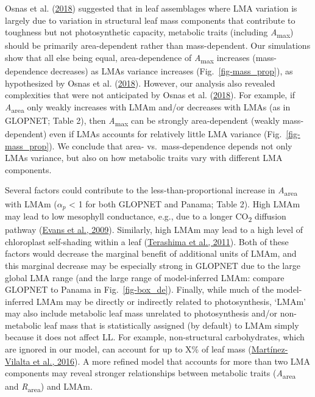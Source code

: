 \documentclass[
  12pt,
  letterpaper,
  DIV=11,
  numbers=noendperiod]{scrartcl}
\begin{document}
Osnas et al. (\protect\hyperlink{ref-Osnas2018}{2018}) suggested that in
leaf assemblages where LMA variation is largely due to variation in
structural leaf mass components that contribute to toughness but not
photosynthetic capacity, metabolic traits (including
\emph{A}\textsubscript{max}) should be primarily area-dependent rather
than mass-dependent. Our simulations show that all else being equal,
area-dependence of \emph{A}\textsubscript{max} increases
(mass-dependence decreases) as LMAs variance increases
(Fig.~\ref{fig-mass_prop}), as hypothesized by Osnas et al.
(\protect\hyperlink{ref-Osnas2018}{2018}). However, our analysis also
revealed complexities that were not anticipated by Osnas et al.
(\protect\hyperlink{ref-Osnas2018}{2018}). For example, if
\emph{A}\textsubscript{area} only weakly increases with LMAm and/or
decreases with LMAs (as in GLOPNET; Table 2), then
\emph{A}\textsubscript{max} can be strongly area-dependent (weakly
mass-dependent) even if LMAs accounts for relatively little LMA variance
(Fig.~\ref{fig-mass_prop}). We conclude that area- vs.~mass-dependence
depends not only LMAs variance, but also on how metabolic traits vary
with different LMA components.

Several factors could contribute to the less-than-proportional increase
in \emph{A}\textsubscript{area} with LMAm (\(\alpha_p\) \textless{} 1
for both GLOPNET and Panama; Table 2). High LMAm may lead to low
mesophyll conductance, e.g., due to a longer CO\textsubscript{2}
diffusion pathway (\protect\hyperlink{ref-Evans2009}{Evans et al.,
2009}). Similarly, high LMAm may lead to a high level of chloroplast
self-shading within a leaf
(\protect\hyperlink{ref-Terashima2011}{Terashima et al., 2011}). Both of
these factors would decrease the marginal benefit of additional units of
LMAm, and this marginal decrease may be especially strong in GLOPNET due
to the large global LMA range (and the large range of model-inferred
LMAm: compare GLOPNET to Panama in Fig.~\ref{fig-box_de}). Finally,
while much of the model-inferred LMAm may be directly or indirectly
related to photosynthesis, `LMAm' may also include metabolic leaf mass
unrelated to photosynthesis and/or non-metabolic leaf mass that is
statistically assigned (by default) to LMAm simply because it does not
affect LL. For example, non-structural carbohydrates, which are ignored
in our model, can account for up to X\% of leaf mass
(\protect\hyperlink{ref-Martinez-Vilalta2016}{Martínez-Vilalta et al.,
2016}). A more refined model that accounts for more than two LMA
components may reveal stronger relationships between metabolic traits
(\emph{A}\textsubscript{area} and \emph{R}\textsubscript{area}) and
LMAm.
\end{document}
